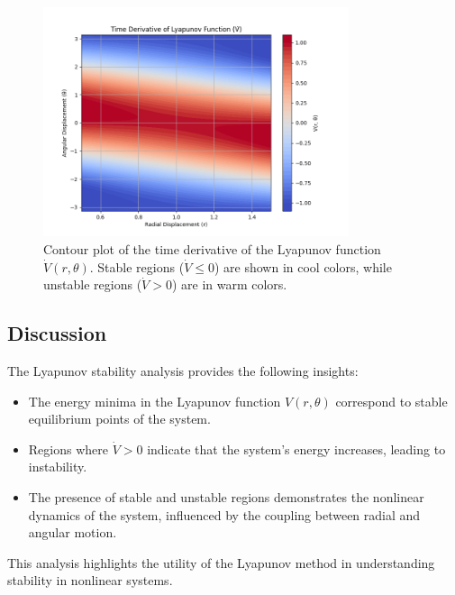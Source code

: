 \documentclass[12pt]{article}
\begin{document}
\begin{figure}[h!]
    \centering
    \includegraphics[width=0.8\textwidth]{lyapunov_derivative.png}
    \caption{Contour plot of the time derivative of the Lyapunov function \( \dot{V}(r, \theta) \). Stable regions (\( \dot{V} \leq 0 \)) are shown in cool colors, while unstable regions (\( \dot{V} > 0 \)) are in warm colors.}
    \label{fig:lyapunov_derivative}
\end{figure}

\subsection{Discussion}
The Lyapunov stability analysis provides the following insights:
\begin{itemize}
    \item The energy minima in the Lyapunov function \( V(r, \theta) \) correspond to stable equilibrium points of the system.
    \item Regions where \( \dot{V} > 0 \) indicate that the system's energy increases, leading to instability.
    \item The presence of stable and unstable regions demonstrates the nonlinear dynamics of the system, influenced by the coupling between radial and angular motion.
\end{itemize}
This analysis highlights the utility of the Lyapunov method in understanding stability in nonlinear systems.


\newpage
\end{document}
